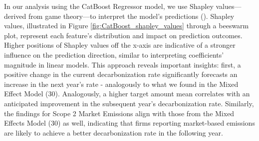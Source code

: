 In our analysis using the CatBoost Regressor model, we use Shapley values—derived from game theory—to interpret the model's predictions (\cite{NIPS2017_7062}). Shapley values, illustrated in Figure \ref{fig:CatBoost_shapley_values} through a beeswarm plot, represent each feature's distribution and impact on prediction outcomes. Higher positions of Shapley values off the x-axis are indicative of a stronger influence on the prediction direction, similar to interpreting coefficients' magnitude in linear models. This approach reveals important insights: first, a positive change in the current decarbonization rate significantly forecasts an increase in the next year’s rate - analogously to what we found in the Mixed Effect Model (30). Analogously, a higher target amount mean correlates with an anticipated improvement in the subsequent year's decarbonization rate. Similarly, the findings for Scope 2 Market Emissions align with those from the Mixed Effects Model (30) as well, indicating that firms reporting market-based emissions are likely to achieve a better decarbonization rate in the following year.





